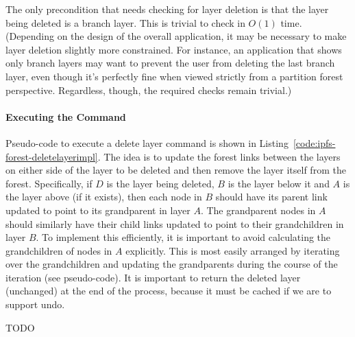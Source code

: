 The only precondition that needs checking for layer deletion is that the layer being deleted is a branch layer. This is trivial to check in $O(1)$ time. (Depending on the design of the overall application, it may be necessary to make layer deletion slightly more constrained. For instance, an application that shows only branch layers may want to prevent the user from deleting the last branch layer, even though it's perfectly fine when viewed strictly from a partition forest perspective. Regardless, though, the required checks remain trivial.)

\paragraph{Executing the Command}

Pseudo-code to execute a delete layer command is shown in Listing~\ref{code:ipfs-forest-deletelayerimpl}. The idea is to update the forest links between the layers on either side of the layer to be deleted and then remove the layer itself from the forest. Specifically, if $D$ is the layer being deleted, $B$ is the layer below it and $A$ is the layer above (if it exists), then each node in $B$ should have its parent link updated to point to its grandparent in layer $A$. The grandparent nodes in $A$ should similarly have their child links updated to point to their grandchildren in layer $B$. To implement this efficiently, it is important to avoid calculating the grandchildren of nodes in $A$ explicitly. This is most easily arranged by iterating over the grandchildren and updating the grandparents during the course of the iteration (see pseudo-code). It is important to return the deleted layer (unchanged) at the end of the process, because it must be cached if we are to support undo.

TODO

